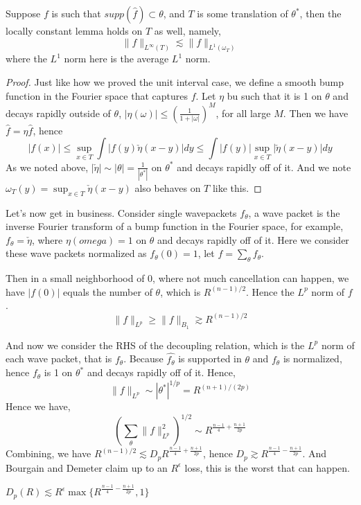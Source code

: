 \begin{lemma}
    Suppose $f$ is such that $supp(\widehat{f})\subset\theta$, and $T$ is some translation of $\theta^*$, then the locally constant lemma holds on $T$ as well, namely,
    \begin{equation*}
        \|f\|_{L^\infty(T)}\lesssim \|f\|_{L^1(\omega_T)}
    \end{equation*}
    where the $L^1$ norm here is the average $L^1$ norm.
\end{lemma}
\begin{proof}
    Just like how we proved the unit interval case, we define a smooth bump function in the Fourier space that captures $f$. Let $\eta$ bu such that it is 1 on $\theta$ and decays rapidly outside of $\theta$, $|\eta(\omega)|\leq\left(\frac{1}{1+|\omega|} \right)^M$, for all large $M$. Then we have $\widehat{f}=\eta\widehat{f}$, hence \begin{equation*}
        |f(x)|\leq\sup_{x\in T}\int|f(y)\check{\eta}(x-y)|dy\leq \int|f(y)|\sup_{x\in T}|\check{\eta}(x-y)|dy
    \end{equation*}
    As we noted above, $|\check{\eta}|\sim |\theta|=\frac{1}{|\theta^*|}$ on $\theta^*$ and decays rapidly off of it. And we note $\omega_T(y)=\sup_{x\in T}\check{\eta}(x-y)$ also behaves on $T$ like this.
\end{proof}

Let's now get in business. Consider single wavepackets $f_\theta$, a wave packet is the inverse Fourier transform of a bump function in the Fourier space, for example, $f_\theta=\check{\eta}$, where $\eta(omega)=1$ on $\theta$ and decays rapidly off of it. Here we consider these wave packets normalized as $f_\theta(0)=1$, let $f=\sum_\theta f_\theta$.

Then in a small neighborhood of $0$, where not much cancellation can happen, we have $|f(0)|$ equals the number of $\theta$, which is $R^{(n-1)/2}$. Hence the $L^p$ norm of $f$.
\begin{equation*}
    \|f\|_{L^p}\geq \|f\|_{B_1}\gtrsim R^{(n-1)/2}
\end{equation*}

And now we consider the RHS of the decoupling relation, which is the $L^p$ norm of each wave packet, that is $f_\theta$. Because $\widehat{f_\theta}$ is supported in $\theta$ and $f_\theta$ is normalized, hence $f_\theta$ is 1 on $\theta^*$ and decays rapidly off of it. Hence,
\begin{equation*}
    \|f\|_{L^p}\sim |\theta^*|^{1/p}=R^{(n+1)/(2p)}
\end{equation*}
Hence we have,
\begin{equation*}
    \left(\sum_\theta\|f\|_{L^p}^2\right)^{1/2}\sim R^{\frac{n-1}{4}+\frac{n+1}{2p}}
\end{equation*}
Combining, we have $R^{(n-1)/2}\lesssim D_p R^{\frac{n-1}{4}+\frac{n+1}{2p}}$, hence $D_p\gtrsim R^{\frac{n-1}{4}-\frac{n+1}{2p}}$. And Bourgain and Demeter claim up to an $R^\epsilon$ loss, this is the worst that can happen.

\begin{theorem}
    $D_p(R)\lesssim R^\epsilon \max\{R^{\frac{n-1}{4}-\frac{n+1}{2p}},1\}$
\end{theorem}

